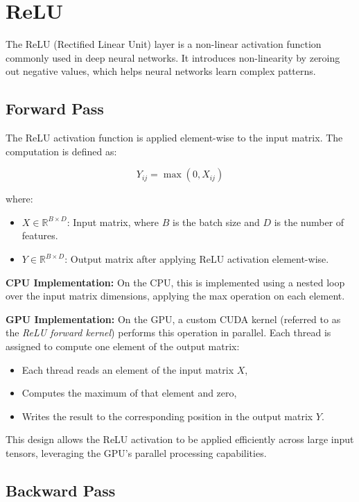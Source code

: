 \section{ReLU}

The ReLU (Rectified Linear Unit) layer is a non-linear activation function commonly used in deep neural networks. It introduces non-linearity by zeroing out negative values, which helps neural networks learn complex patterns.

\subsection{Forward Pass}

The ReLU activation function is applied element-wise to the input matrix. The computation is defined as:

\[
    Y_{ij} = \max(0, X_{ij})
\]

where:
\begin{itemize}
    \item \( X \in \mathbb{R}^{B \times D} \): Input matrix, where \( B \) is the batch size and \( D \) is the number of features.
    \item \( Y \in \mathbb{R}^{B \times D} \): Output matrix after applying ReLU activation element-wise.
\end{itemize}

\textbf{CPU Implementation:}  
On the CPU, this is implemented using a nested loop over the input matrix dimensions, applying the max operation on each element.

\textbf{GPU Implementation:}  
On the GPU, a custom CUDA kernel (referred to as the \textit{ReLU forward kernel}) performs this operation in parallel. Each thread is assigned to compute one element of the output matrix:

\begin{itemize}
    \item Each thread reads an element of the input matrix \( X \),
    \item Computes the maximum of that element and zero,
    \item Writes the result to the corresponding position in the output matrix \( Y \).
\end{itemize}

This design allows the ReLU activation to be applied efficiently across large input tensors, leveraging the GPU's parallel processing capabilities.

\subsection{Backward Pass}

